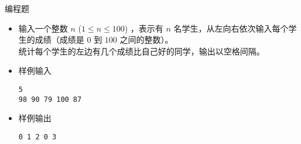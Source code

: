 \begin{frame}[fragile]
{{\begin{itemize}
            \end{itemize}
        }{
            \begin{exampleblock}{编程题}

                \begin{itemize}
                    \item 输入一个整数 $n$ ($1 \le n \le 100$) ，表示有 $n$ 名学生，从左向右依次输入每个学生的成绩（成绩是 $0$ 到 $100$ 之间的整数）。\\
                        统计每个学生的左边有几个成绩比自己好的同学，输出以空格间隔。

                    \item 样例输入

                        \lstinline|5|\\
                        \lstinline|98 90 79 100 87|

                    \item 样例输出

                        \lstinline|0 1 2 0 3|

                \end{itemize}

            \end{exampleblock}
        }
    }
\end{frame}

